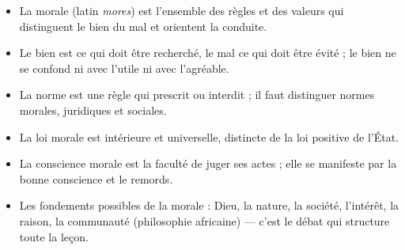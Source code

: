 \documentclass[11pt]{article}
\newcommand{\cle}[1]{{\popxbold\color{popdark}#1}}
\begin{document}
\begin{aretenir}
\begin{itemize}
  \item La \cle{morale} (latin \emph{mores}) est l'ensemble des règles et des valeurs qui distinguent le bien du mal et orientent la conduite.
  \item Le \cle{bien} est ce qui doit être recherché, le \cle{mal} ce qui doit être évité ; le bien ne se confond ni avec l'utile ni avec l'agréable.
  \item La \cle{norme} est une règle qui prescrit ou interdit ; il faut distinguer normes morales, juridiques et sociales.
  \item La \cle{loi morale} est intérieure et universelle, distincte de la loi positive de l'État.
  \item La \cle{conscience morale} est la faculté de juger ses actes ; elle se manifeste par la bonne conscience et le remords.
  \item Les fondements possibles de la morale : Dieu, la nature, la société, l'intérêt, la raison, la communauté (philosophie africaine) — c'est le débat qui structure toute la leçon.
\end{itemize}
\end{aretenir}
\end{document}
